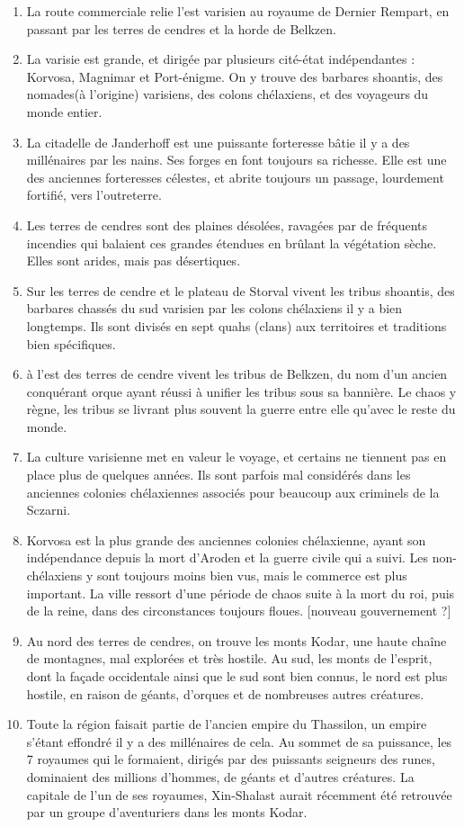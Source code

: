 \documentclass[letterpaper,10pt,twoside,twocolumn,openany]{book}
\begin{document}
\begin{enumerate}
    \item La route commerciale relie l'est varisien au royaume de Dernier Rempart, en passant par les terres de cendres et la horde de Belkzen.
    \item La varisie est grande, et dirigée par plusieurs cité-état indépendantes : Korvosa, Magnimar et Port-énigme. On y trouve des barbares shoantis, des nomades(à l'origine) varisiens, des colons chélaxiens, et des voyageurs du monde entier.
    \item La citadelle de Janderhoff est une puissante forteresse bâtie il y a des millénaires par les nains. Ses forges en font toujours sa richesse. Elle est une des anciennes forteresses célestes, et abrite toujours un passage, lourdement fortifié, vers l'outreterre.
    \item Les terres de cendres sont des plaines désolées, ravagées par de fréquents incendies qui balaient ces grandes étendues en brûlant la végétation sèche. Elles sont arides, mais pas désertiques. 
    \item Sur les terres de cendre et le plateau de Storval vivent les tribus shoantis, des barbares chassés du sud varisien par les colons chélaxiens il y a bien longtemps. Ils sont divisés en sept quahs (clans) aux territoires et traditions bien spécifiques.
    \item à l'est des terres de cendre vivent les tribus de Belkzen, du nom d'un ancien conquérant orque ayant réussi à unifier les tribus sous sa bannière. Le chaos y règne, les tribus se livrant plus souvent la guerre entre elle qu'avec le reste du monde.
    \item La culture varisienne met en valeur le voyage, et certains ne tiennent pas en place plus de quelques années. Ils sont parfois mal considérés dans les anciennes colonies chélaxiennes associés pour beaucoup aux criminels de la Sczarni.
    \item Korvosa est la plus grande des anciennes colonies chélaxienne, ayant son indépendance depuis la mort d'Aroden et la guerre civile qui a suivi. Les non-chélaxiens y sont toujours moins bien vus, mais le commerce est plus important. La ville ressort d'une période de chaos suite à la mort du roi, puis de la reine, dans des circonstances toujours floues. [nouveau gouvernement ?]
    \item Au nord des terres de cendres, on trouve les monts Kodar, une haute chaîne de montagnes, mal explorées et très hostile. Au sud, les monts de l'esprit, dont la façade occidentale ainsi que le sud sont bien connus, le nord est plus hostile, en raison de géants, d'orques et de nombreuses autres créatures.
    \item Toute la région faisait partie de l'ancien empire du Thassilon, un empire s'étant effondré il y a des millénaires de cela. Au sommet de sa puissance, les 7 royaumes qui le formaient, dirigés par des puissants seigneurs des runes, dominaient des millions d'hommes, de géants et d'autres créatures. La capitale de l'un de ses royaumes, Xin-Shalast aurait récemment été retrouvée par un groupe d'aventuriers dans les monts Kodar.
\end{enumerate}
\end{document}

